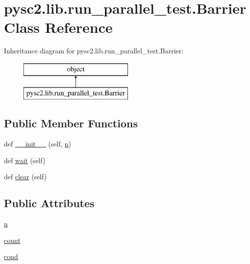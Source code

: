 \hypertarget{classpysc2_1_1lib_1_1run__parallel__test_1_1_barrier}{}\section{pysc2.\+lib.\+run\+\_\+parallel\+\_\+test.\+Barrier Class Reference}
\label{classpysc2_1_1lib_1_1run__parallel__test_1_1_barrier}
Inheritance diagram for pysc2.\+lib.\+run\+\_\+parallel\+\_\+test.\+Barrier\+:\begin{figure}[H]
\begin{center}
\leavevmode
\includegraphics[height=2.000000cm]{classpysc2_1_1lib_1_1run__parallel__test_1_1_barrier}
\end{center}
\end{figure}
\subsection*{Public Member Functions}
\begin{DoxyCompactItemize}
\item 
def \mbox{\hyperlink{classpysc2_1_1lib_1_1run__parallel__test_1_1_barrier_a77e987f83cb0038718cddacc812e063c}{\+\_\+\+\_\+init\+\_\+\+\_\+}} (self, \mbox{\hyperlink{classpysc2_1_1lib_1_1run__parallel__test_1_1_barrier_ac8c9432b90c8b37ec7e5f0b5db77a473}{n}})
\item 
def \mbox{\hyperlink{classpysc2_1_1lib_1_1run__parallel__test_1_1_barrier_a0d5f345a8b99d03145c5c742e0f197f7}{wait}} (self)
\item 
def \mbox{\hyperlink{classpysc2_1_1lib_1_1run__parallel__test_1_1_barrier_a5216f6a490702f42fcead15daf544589}{clear}} (self)
\end{DoxyCompactItemize}
\subsection*{Public Attributes}
\begin{DoxyCompactItemize}
\item 
\mbox{\hyperlink{classpysc2_1_1lib_1_1run__parallel__test_1_1_barrier_ac8c9432b90c8b37ec7e5f0b5db77a473}{n}}
\item 
\mbox{\hyperlink{classpysc2_1_1lib_1_1run__parallel__test_1_1_barrier_aa4e9eeac4fac8f01df640fb2b881bf6d}{count}}
\item 
\mbox{\hyperlink{classpysc2_1_1lib_1_1run__parallel__test_1_1_barrier_a0439c79d387511bcea1606fea651388e}{cond}}
\end{DoxyCompactItemize}


